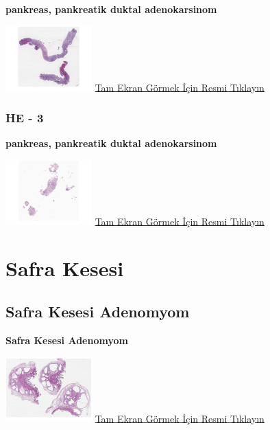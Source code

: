 \documentclass[
  letterpaper,
  DIV=11,
  numbers=noendperiod]{scrreprt}
\begin{document}
\textbf{pankreas, pankreatik duktal adenokarsinom}

\href{https://images.patolojiatlasi.com/PDAC-tru-cut/HE2.html}{\includegraphics[width=0.25\textwidth,height=\textheight]{./screenshots/PDAC-tru-cut-2_screenshot.png}}
\href{https://images.patolojiatlasi.com/PDAC-tru-cut/HE2.html}{Tam Ekran
Görmek İçin Resmi Tıklayın}

\hypertarget{he---3-2}{%
\subsection{HE - 3}\label{he---3-2}}

\textbf{pankreas, pankreatik duktal adenokarsinom}

\href{https://images.patolojiatlasi.com/PDAC-tru-cut/HE3.html}{\includegraphics[width=0.25\textwidth,height=\textheight]{./screenshots/PDAC-tru-cut-3_screenshot.png}}
\href{https://images.patolojiatlasi.com/PDAC-tru-cut/HE3.html}{Tam Ekran
Görmek İçin Resmi Tıklayın}

\hypertarget{sec-safra-kesesi}{%
\chapter{Safra Kesesi}\label{sec-safra-kesesi}}

\hypertarget{sec-safra-kesesi-adenomyom}{%
\section{Safra Kesesi Adenomyom}\label{sec-safra-kesesi-adenomyom}}

\textbf{Safra Kesesi Adenomyom}

\href{https://images.patolojiatlasi.com/gallbladder-adenomyoma/HE.html}{\includegraphics[width=0.25\textwidth,height=\textheight]{./screenshots/gallbladder-adenomyoma_screenshot.png}}
\href{https://images.patolojiatlasi.com/gallbladder-adenomyoma/HE.html}{Tam
Ekran Görmek İçin Resmi Tıklayın}
\end{document}
